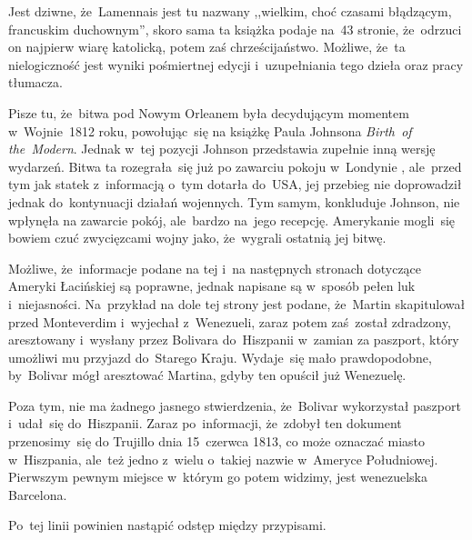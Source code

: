 \documentclass[a4paper,11pt]{article}
\begin{document}
\vspace{\spaceFour}


\start {} Jest dziwne, że~Lamennais jest tu nazwany ,,wielkim,
choć czasami błądzącym, francuskim duchownym'', skoro sama ta książka
podaje na~43 stronie, że~odrzuci on najpierw wiarę katolicką, potem
zaś chrześcijaństwo. Możliwe, że~ta nielogiczność jest wyniki
pośmiertnej edycji i~uzupełniania tego dzieła oraz pracy tłumacza.

\vspace{\spaceFour}


\start {} Pisze tu, że~bitwa pod Nowym Orleanem była decydującym
momentem w~Wojnie~1812 roku, powołując~się na książkę Paula Johnsona
\emph{Birth~of the~Modern}. Jednak w~tej pozycji Johnson przedstawia
zupełnie inną wersję wydarzeń. Bitwa ta rozegrała~się już po zawarciu
pokoju w~Londynie , ale~przed tym jak statek
z~informacją o~tym dotarła do~USA, jej przebieg nie doprowadził jednak
do~kontynuacji działań wojennych. Tym samym, konkluduje Johnson, nie
wpłynęła na zawarcie pokój, ale~bardzo na~jego recepcję. Amerykanie
mogli~się bowiem czuć zwycięzcami wojny jako, że~wygrali ostatnią jej
bitwę.

\vspace{\spaceFour}


\start {} Możliwe, że~informacje podane na tej i~na następnych
stronach dotyczące Ameryki Łacińskiej są poprawne, jednak napisane są
w~sposób pełen luk i~niejasności. Na~przykład na dole tej strony jest
podane, że~Martin skapitulował przed Monteverdim i~wyjechał
z~Wenezueli, zaraz potem zaś~został zdradzony, aresztowany i~wysłany
przez Bolivara do~Hiszpanii w~zamian za paszport, który umożliwi mu
przyjazd do~Starego Kraju. Wydaje~się mało prawdopodobne, by~Bolivar
mógł aresztować Martina, gdyby ten opuścił już Wenezuelę.

Poza tym, nie ma żadnego jasnego stwierdzenia, że~Bolivar wykorzystał
paszport i~udał~się do~Hiszpanii. Zaraz po~informacji, że~zdobył ten
dokument przenosimy~się do Trujillo dnia 15~czerwca 1813, co może
oznaczać miasto w~Hiszpania, ale~też jedno z~wielu o~takiej nazwie
w~Ameryce Południowej. Pierwszym pewnym miejsce w~którym go potem
widzimy, jest wenezuelska Barcelona.

\vspace{\spaceFour}


\start {} Po~tej linii powinien nastąpić odstęp między
przypisami.

\vspace{\spaceFour}
\end{document}

